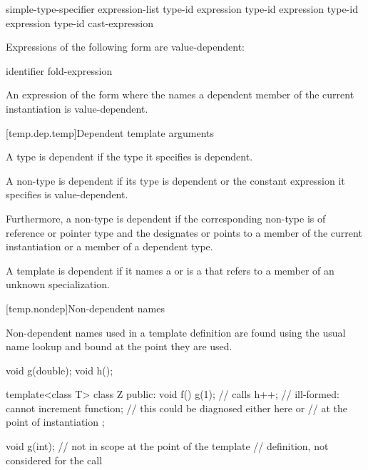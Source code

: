 \begin{ncbnftab}
simple-type-specifier \terminal{(} expression-list\opt{} \terminal{)}\br
{} type-id \terminal{> (} expression \terminal{)}\br
{} type-id \terminal{> (} expression \terminal{)}\br
{} type-id \terminal{> (} expression \terminal{)}\br
\terminal{(} type-id \terminal{)} cast-expression
\end{ncbnftab}

\pnum
Expressions of the following form are value-dependent:

\begin{ncbnftab}
  \terminal{(} identifier \terminal{)}\br
fold-expression
\end{ncbnftab}

\pnum
An expression of the form \tcode{\&} where the
 names a dependent member of the current
instantiation is value-dependent.

[temp.dep.temp]{Dependent template arguments}

\pnum
A type
is dependent if the type it specifies is dependent.

\pnum
A non-type
is dependent if its type is dependent or the constant
expression it specifies is value-dependent.

\pnum
Furthermore, a non-type
is dependent if the corresponding non-type 
is of reference or pointer type and the 
designates or points to a member of the current instantiation or a member of
a dependent type.

\pnum
A template
is dependent if it names a
or is a
that refers to a member of an unknown specialization.

[temp.nondep]{Non-dependent names}

\pnum
Non-dependent names used in a template definition are found using the
usual name lookup and bound at the point they are used.
\enterexample

\begin{codeblock}
void g(double);
void h();

template<class T> class Z {
public:
  void f() {
    g(1);           // calls 
    h++;            // ill-formed: cannot increment function;
                    // this could be diagnosed either here or
                    // at the point of instantiation
  }
};

void g(int);        // not in scope at the point of the template
                    // definition, not considered for the call 
\end{codeblock}
\exitexample

